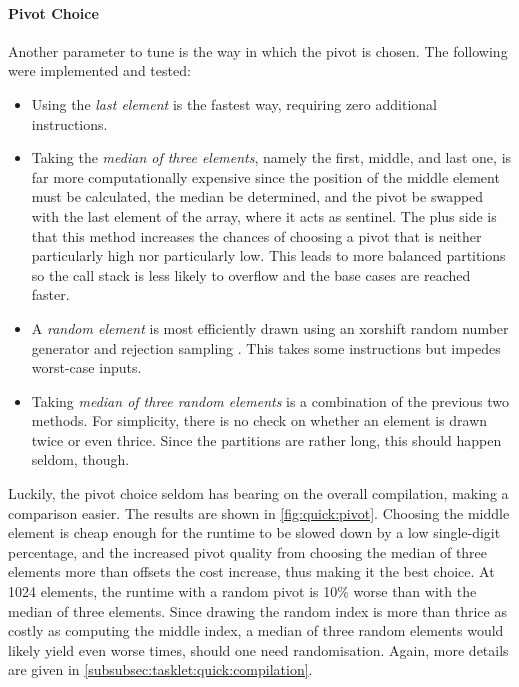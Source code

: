 \paragraph{Pivot Choice}
Another parameter to tune is the way in which the pivot is chosen.
The following were implemented and tested:
\begin{itemize}
	\item
	Using the \emph{last element} is the fastest way, requiring zero additional instructions.


	\item
	Taking the \emph{median of three elements}, namely the first, middle, and last one, is far more computationally expensive since the position of the middle element must be calculated, the median be determined, and the pivot be swapped with the last element of the array, where it acts as sentinel.
	The plus side is that this method increases the chances of choosing a pivot that is neither particularly high nor particularly low.
	This leads to more balanced partitions so the call stack is less likely to overflow and the base cases are reached faster.

	\item
	A \emph{random element} is most efficiently drawn using an xorshift random number generator and rejection sampling \cite{lukas_geis}.
	This takes some instructions but impedes worst-case inputs.

	\item
	Taking \emph{median of three random elements} is a combination of the previous two methods.
	For simplicity, there is no check on whether an element is drawn twice or even thrice.
	Since the partitions are rather long, this should happen seldom, though.
\end{itemize}
Luckily, the pivot choice seldom has bearing on the overall compilation, making a comparison easier.
The results are shown in \cref{fig:quick:pivot}.
Choosing the middle element is cheap enough for the runtime to be slowed down by a low single-digit percentage, and the increased pivot quality from choosing the median of three elements more than offsets the cost increase, thus making it the best choice.
At 1024 elements, the runtime with a random pivot is 10\% worse than with the median of three elements.
Since drawing the random index is more than thrice as costly as computing the middle index, a median of three random elements would likely yield even worse times, should one need randomisation.
Again, more details are given in \cref{subsubsec:tasklet:quick:compilation}.

